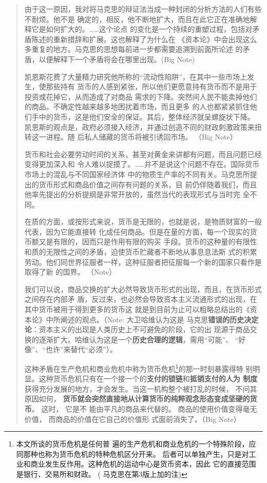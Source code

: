 \begin{quotation}
由于这一原因，我对将马克思的辩证法当成一种封闭的分析方法的人们有些不耐烦。他不是
确定的，相反，他不断地扩大，而且在此它正在准确地解释它是如何扩大的。……这个论点
的变化是一个持续的重塑过程，包括对矛盾陈述的重新措辞和扩展。这也解释了为什么在
《资本论》中会出现这么多重复的地方。马克思的思想每前进一步都需要追溯到前面所论述
的矛盾，以便解释下一个矛盾将会在哪里出现。(Big Note) 

凯恩斯花费了大量精力研究他所称的“流动性陷阱”，在其中一些市场上发生，使那些持有
货币的人感到紧张，所以他们更愿意持有货币而不是用于投资或花掉它，从而造成了对商品
需求的下降。突然间人民不能卖掉他们的商品。不确定性越来越多地困扰着市场，而且更多
的人也都紧紧抓住他们手中的货币，这是他们安全的保证。其后，整体经济就呈螺旋状下降。
凯恩斯的观点是，政府必须接入经济，并通过创造不同的财政刺激政策来扭转这一进程。随
后私人储藏的货币将被引诱回市场。 （Big Note）

货币和社会必要劳动时间的关系，甚至对黄金来讲都有问题，而且问题已经变得更加深入和
令人难以捉摸了。……并不是说这个问题不存在。国际货币市场上的混乱与不同国家经济体
中的物质生产率的不同有关。马克思所提出的货币形式和商品价值之间存有问题的关系，目
前仍伴随着我们，而且他率先提出的分析提纲是非常开放的，虽然当代的表现形式与当时完
全不同。 

在质的方面，或按形式来说，货币是无限的，也就是说，是物质财富的一般代表，因为它能直接转
化成任何商品。但是在量的方面，每一个现实的货币额又是有限的，因而只是作用有限的购买
手段。货币的这种量的有限性和质的无限性之间的矛盾，迫使货币贮藏者不断地从事息息法斯
式的积累劳动。他们同世界征服者一样，这种征服者把征服每一个新的国家只看作是取得了新
的国界。 （Note）

我们可以说，商品交换的扩大必然导致货币形式的出现，而且，在货币形式之间存在内部矛
盾，反过来，也必然会导致资本主义流通形式的出现，在其中货币被用于得到更多的货币这
就是到目前为止可以粗略总结出的《资本论》中所阐述的观点。（Note: 大卫哈维认为这是
马克思\textbf{错误的历史决定论}：资本主义的出现是人类历史上不可避免的阶段，它的出
现源于商品交换的逐渐扩大。哈维认为这是一个\textbf{历史合理的逻辑}，需用“可能”、
“好像”、“也许”来替代“必须”）。

这种矛盾在生产危机和商业危机中称为货币危机\footnote{本文所谈的货币危机是任何普
  遍的生产危机和商业危机的一个特殊阶段，应同那种也称为货币危机的特种危机区分开来。
  后者可以单独产生，只是对工业和商业发生反作用。这种危机的运动中心是货币资本，因此
  它的直接范围是银行、交易所和财政。 ( 马克思在第3版上加的注)}的那一时刻暴露得特
别明显。这种货币危机只有在一个接一个的\textbf{支付的锁链}和\textbf{抵销支付的人为
  制度}获得充分发展的地方，才会发生。当这一机构整个被打乱的时候， 不问其原因如何，
\textbf{货币就会突然直接地从计算货币的纯粹观念形态变成坚硬的货币}。 这时， 它是不
能由平凡的商品来代替的。 商品的使用价值变得毫无价值， 而商品的价值在它自己的价值形
式面前消失了。（Big Note） 


\end{quotation}
